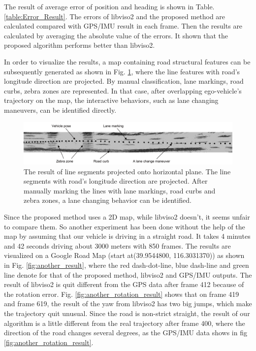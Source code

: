\documentclass[letterpaper, 10 pt, conference]{ieeeconf}  %
\begin{document}
The result of average error of position and heading is shown in Table. \ref{table:Error_Result}. The errors of libviso2 and the proposed method are calculated compared with GPS/IMU result in each frame. Then the results are calculated by averaging the absolute value of the errors. It shown that the proposed algorithm performs better than libviso2.

In order to visualize the results, a map containing road structural features can be subsequently generated as shown in Fig. \ref{fig:lineProjection}, where the line features with road's longitude direction are projected. By manual classification, lane markings, road curbs, zebra zones are represented. In that case, after overlapping ego-vehicle's trajectory on the map, the interactive behaviors, such as lane changing maneuvers, can be identified directly.
\begin{figure}
\centering
\includegraphics[width=1\linewidth]{source//Final//horizon_line.pdf}
\caption{The result of line segments projected onto horizontal plane. The line segments with road's longitude direction are projected. After manually marking the lines with lane markings, road curbs and zebra zones, a lane changing behavior can be identified.}
\label{fig:lineProjection}
\end{figure}

Since the proposed method uses a 2D map, while libviso2 doesn't, it seems unfair to compare them. So another experiment has been done without the help of the map by assuming that our vehicle is driving in a straight road. It takes 4 minutes and 42 seconds driving about 3000 meters with 850 frames. The results are visualized on a Google Road Map (start at(39.9544800, 116.3031370)) as shown in Fig. \ref{fig:another_result}, where the red dash-dot-line, blue dash-line and green line denote for that of the proposed method, libviso2 and GPS/IMU outputs. The result of libviso2 is quit different from the GPS data after frame 412 because of the rotation error. Fig. \ref{fig:another_rotation_result} shows that on frame 419 and frame 619, the result of the yaw from libviso2 has two big jumps, which make the trajectory quit unusual. Since the road is non-strict straight, the result of our algorithm is a little different from the real trajectory after frame 400, where the direction of the road changes several degrees, as the GPS/IMU data shows in fig \ref{fig:another_rotation_result}.
\end{document}
